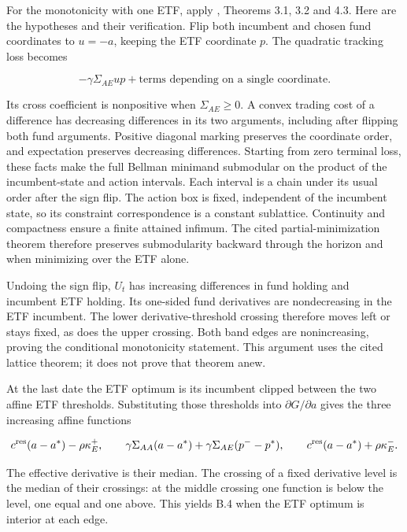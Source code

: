 \documentclass[11pt]{article}
\begin{document}
For the monotonicity with one ETF, apply \cite{topkis1978minimizing}, Theorems 3.1, 3.2 and 4.3. Here are the hypotheses and their verification. Flip both incumbent and chosen fund coordinates to \(u=-a\), keeping the ETF coordinate \(p\). The quadratic tracking loss becomes

\begin{equation*}
-\gamma\Sigma_{AE}up+\text{terms depending on a single coordinate}.
\end{equation*}

Its cross coefficient is nonpositive when \(\Sigma_{AE}\geq0\). A convex trading cost of a difference has decreasing differences in its two arguments, including after flipping both fund arguments. Positive diagonal marking preserves the coordinate order, and expectation preserves decreasing differences. Starting from zero terminal loss, these facts make the full Bellman minimand submodular on the product of the incumbent-state and action intervals. Each interval is a chain under its usual order after the sign flip. The action box is fixed, independent of the incumbent state, so its constraint correspondence is a constant sublattice. Continuity and compactness ensure a finite attained infimum. The cited partial-minimization theorem therefore preserves submodularity backward through the horizon and when minimizing over the ETF alone.

Undoing the sign flip, \(U_t\) has increasing differences in fund holding and incumbent ETF holding. Its one-sided fund derivatives are nondecreasing in the ETF incumbent. The lower derivative-threshold crossing therefore moves left or stays fixed, as does the upper crossing. Both band edges are nonincreasing, proving the conditional monotonicity statement. This argument uses the cited lattice theorem; it does not prove that theorem anew.

At the last date the ETF optimum is its incumbent clipped between the two affine ETF thresholds. Substituting those thresholds into \(\partial G/\partial a\) gives the three increasing affine functions

\begin{equation*}
c^{\rm res}(a-a^*)-\rho\kappa_E^+,\qquad
\gamma\Sigma_{AA}(a-a^*)+\gamma\Sigma_{AE}(p^--p^*),\qquad
c^{\rm res}(a-a^*)+\rho\kappa_E^-.
\end{equation*}

The effective derivative is their median. The crossing of a fixed derivative level is the median of their crossings: at the middle crossing one function is below the level, one equal and one above. This yields B.4 when the ETF optimum is interior at each edge.
\end{document}
